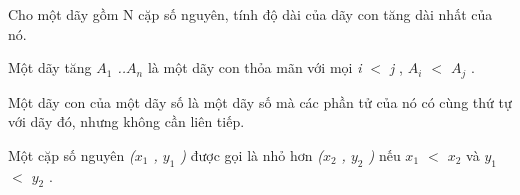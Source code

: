 Cho một dãy gồm       N      cặp số nguyên, tính độ dài của       dãy con tăng dài nhất      của nó.  

   Một       dãy tăng      \textit{    $A_{1}$    ..$A_{n}$}   là một dãy con thỏa mãn với mọi   \textit{    i $<$ j   }   ,   \textit{    $A_{i}$    $<$ $A_{j}$}   .  

   Một       dãy con      của một dãy số là một dãy số mà các phần tử của nó có cùng thứ tự với dãy đó, nhưng không cần liên tiếp.  

   Một cặp số nguyên   \textit{    ($x_{1}$    , $y_{1}$    )   }   được gọi là nhỏ hơn   \textit{    ($x_{2}$    , $y_{2}$    )   }       nếu      \textit{    $x_{1}$    $<$ $x_{2}$}   và   \textit{    $y_{1}$    $<$ $y_{2}$}   .